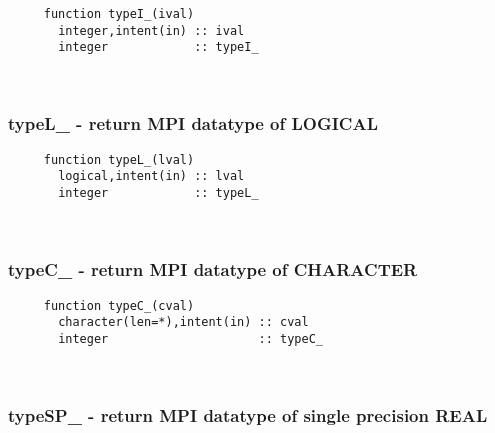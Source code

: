 \begin{verbatim} 
     function typeI_(ival)
       integer,intent(in) :: ival
       integer            :: typeI_
 \end{verbatim}%
 
 
\mbox{}\hrulefill\ 
 
  \subsubsection{typeL\_ - return MPI datatype of LOGICAL}

\begin{verbatim} 
     function typeL_(lval)
       logical,intent(in) :: lval
       integer            :: typeL_
 \end{verbatim}%
 
 
\mbox{}\hrulefill\ 

  \subsubsection{typeC\_ - return MPI datatype of CHARACTER}

\begin{verbatim} 
     function typeC_(cval)
       character(len=*),intent(in) :: cval
       integer                     :: typeC_
 \end{verbatim}%
 
 
\mbox{}\hrulefill\ 
 
  \subsubsection{typeSP\_ - return MPI datatype of single precision REAL}

